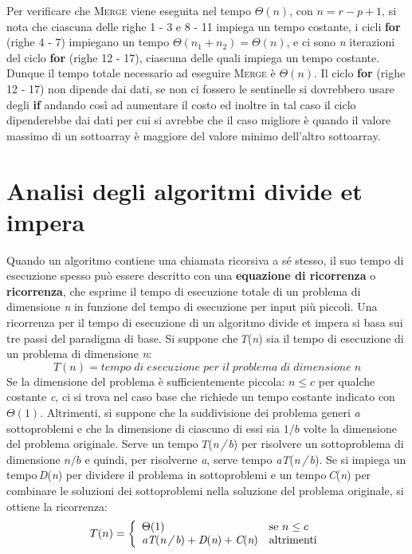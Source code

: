 \documentclass[10pt, a4paper]{report}
\begin{document}
Per verificare che \textsc{Merge} viene eseguita nel tempo $\Theta(n)$, con $n = r - p + 1$, si nota che ciascuna delle righe 1 - 3 e  8 - 11 impiega un tempo costante, i cicli \textbf{for} (righe 4 - 7) impiegano un tempo $\Theta(n_1 + n_2) = \Theta(n)$, e ci sono \textit{n} iterazioni del ciclo \textbf{for} (righe 12 - 17), ciascuna delle quali impiega un tempo costante. Dunque il tempo totale necessario ad eseguire \textsc{Merge} è $\Theta(n)$. Il ciclo \textbf{for} (righe 12 - 17) non dipende dai dati, se non ci fossero le sentinelle si dovrebbero usare degli \textbf{if} andando così ad aumentare il costo ed inoltre in tal caso il ciclo dipenderebbe dai dati per cui si avrebbe che il caso migliore è quando il valore massimo di un sottoarray è maggiore del valore minimo dell'altro sottoarray.
\section{Analisi degli algoritmi divide et impera}
Quando un algoritmo contiene una chiamata ricorsiva a sé stesso, il suo tempo di esecuzione spesso può essere descritto con una \textbf{equazione di ricorrenza} o \textbf{ricorrenza}, che esprime il tempo di esecuzione totale di un problema di dimensione \textit{n} in funzione del tempo di esecuzione per input più piccoli. Una ricorrenza  per il tempo di esecuzione di un algoritmo divide et impera si basa sui tre passi del paradigma di base. Si suppone che\,\textit{T}(\textit{n}) sia il tempo di esecuzione di un problema di dimensione \textit{n}:
\begin{equation*}
T(n) = tempo\;di\;esecuzione\;per\;il\;problema\;di\;dimensione\;\textit{n}
\end{equation*}
Se la dimensione del problema è sufficientemente piccola: $n \leq c$ per qualche costante \textit{c}, ci si trova nel caso base che richiede un tempo costante indicato con $\Theta(1)$. Altrimenti, si suppone che la suddivisione dei problema generi \textit{a} sottoproblemi e che la dimensione di ciascuno di essi sia $1/b$ volte la dimensione del problema originale. Serve un tempo\,\textit{T}(\textit{n\,/\,\textit{b}}) per risolvere un sottoproblema di dimensione $n/b$ e quindi, per risolverne \textit{a}, serve tempo \textit{aT}(\textit{n\,/\,\textit{b}}). Se si impiega un tempo\,\textit{D}(\textit{n}) per dividere il problema in sottoproblemi e un tempo\,\textit{C}(\textit{n}) per combinare le soluzioni dei sottoproblemi nella soluzione del problema originale, si ottiene la ricorrenza:\\
\begin{equation*}
T(n) = \left\{
\begin{array}{ll}
\Theta(1) & \text{se $n \leq c$} \\
\textit{aT}(\textit{n\,/\,\textit{b}}) + \textit{D}(\textit{n}) + \textit{C}(\textit{n}) & \text{altrimenti}
\end{array}\right.
\end{equation*}
\end{document}
